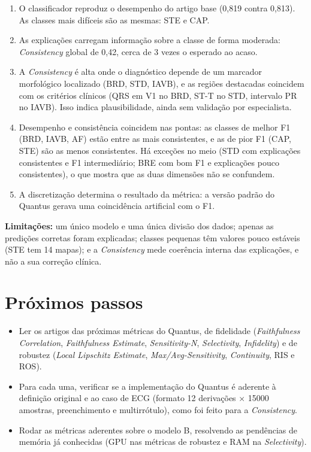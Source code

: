 \documentclass[11pt,a4paper]{article}
\begin{document}
\begin{enumerate}
    \item O classificador reproduz o desempenho do artigo base (0,819 contra 0,813). As classes mais difíceis são as mesmas: STE e CAP.
    \item As explicações carregam informação sobre a classe de forma moderada: \textit{Consistency} global de 0,42, cerca de 3 vezes o esperado ao acaso.
    \item A \textit{Consistency} é alta onde o diagnóstico depende de um marcador morfológico localizado (BRD, STD, IAVB), e as regiões destacadas coincidem com os critérios clínicos (QRS em V1 no BRD, ST-T no STD, intervalo PR no IAVB). Isso indica plausibilidade, ainda sem validação por especialista.
    \item Desempenho e consistência coincidem nas pontas: as classes de melhor F1 (BRD, IAVB, AF) estão entre as mais consistentes, e as de pior F1 (CAP, STE) são as menos consistentes. Há exceções no meio (STD com explicações consistentes e F1 intermediário; BRE com bom F1 e explicações pouco consistentes), o que mostra que as duas dimensões não se confundem.
    \item A discretização determina o resultado da métrica: a versão padrão do Quantus gerava uma coincidência artificial com o F1.
\end{enumerate}

\textbf{Limitações:} um único modelo e uma única divisão dos dados; apenas as predições corretas foram explicadas; classes pequenas têm valores pouco estáveis (STE tem 14 mapas); e a \textit{Consistency} mede coerência interna das explicações, e não a sua correção clínica.

\section{Próximos passos}

\begin{itemize}
    \item Ler os artigos das próximas métricas do Quantus, de fidelidade (\textit{Faithfulness Correlation}, \textit{Faithfulness Estimate}, \textit{Sensitivity-N}, \textit{Selectivity}, \textit{Infidelity}) e de robustez (\textit{Local Lipschitz Estimate}, \textit{Max/Avg-Sensitivity}, \textit{Continuity}, RIS e ROS).
    \item Para cada uma, verificar se a implementação do Quantus é aderente à definição original e ao caso de ECG (formato 12 derivações $\times$ 15000 amostras, preenchimento e multirrótulo), como foi feito para a \textit{Consistency}.
    \item Rodar as métricas aderentes sobre o modelo B, resolvendo as pendências de memória já conhecidas (GPU nas métricas de robustez e RAM na \textit{Selectivity}).
\end{itemize}
\end{document}
